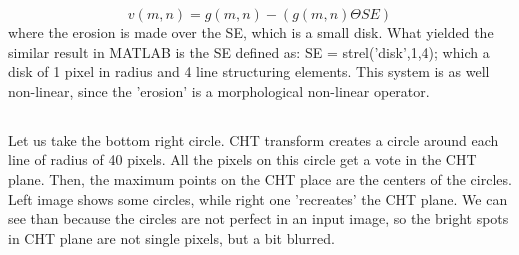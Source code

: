 \documentclass[a4paper]{iacas}
\begin{document}
\begin{equation*}
v(m,n) = g(m,n) - (g(m,n)\Theta SE)
\end{equation*}
where the erosion is made over the SE, which is a small disk. What yielded the similar result in MATLAB is the SE defined as:
\newline
SE = strel('disk',1,4);
\newline
which a disk of 1 pixel in radius and 4 line structuring elements. This system is as well non-linear, since the 'erosion' is a morphological non-linear operator.

\subsection{}
Let us take the bottom right circle. CHT transform creates a circle around each line of radius of 40 pixels. All the pixels on this circle get a vote in the CHT plane. Then, the maximum points on the CHT place are the centers of the circles. Left image shows some circles, while right one 'recreates' the CHT plane. We can see than because the circles are not perfect in an input image, so the bright spots in CHT plane are not single pixels, but a bit blurred.
\end{document}

